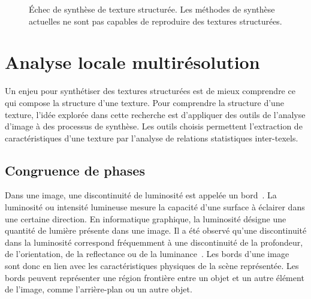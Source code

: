 \begin{figure}
    \caption[Échec de synthèse de texture structurée]{Échec de synthèse de texture structurée. Les méthodes de synthèse actuelles ne sont pas capables de reproduire des textures structurées.}
    \label{fig:synthesis-failure}
\end{figure}

\section{Analyse locale multirésolution}

Un enjeu pour synthétiser des textures structurées est de mieux comprendre ce qui compose la structure d'une texture. Pour comprendre la structure d'une texture, l'idée explorée dans cette recherche est d'appliquer des outils de l'analyse d'image à des processus de synthèse. Les outils choisis permettent l'extraction de caractéristiques d'une texture par l'analyse de relations statistiques inter-texels.

\subsection{Congruence de phases}

Dans une image, une discontinuité de luminosité est appelée un bord~\cite{torre_edge_1986}. La luminosité ou intensité lumineuse mesure la capacité d'une surface à éclairer dans une certaine direction. En informatique graphique, la luminosité désigne une quantité de lumière présente dans une image. Il a été observé qu'une discontinuité dans la luminosité correspond fréquemment à une discontinuité de la profondeur, de l'orientation, de la reflectance ou de la luminance~\cite{lindeberg_edge_1998}. Les bords d'une image sont donc en lien avec les caractéristiques physiques de la scène représentée. Les bords peuvent représenter une région frontière entre un objet et un autre élément de l'image, comme l'arrière-plan ou un autre objet.

\bigskip

